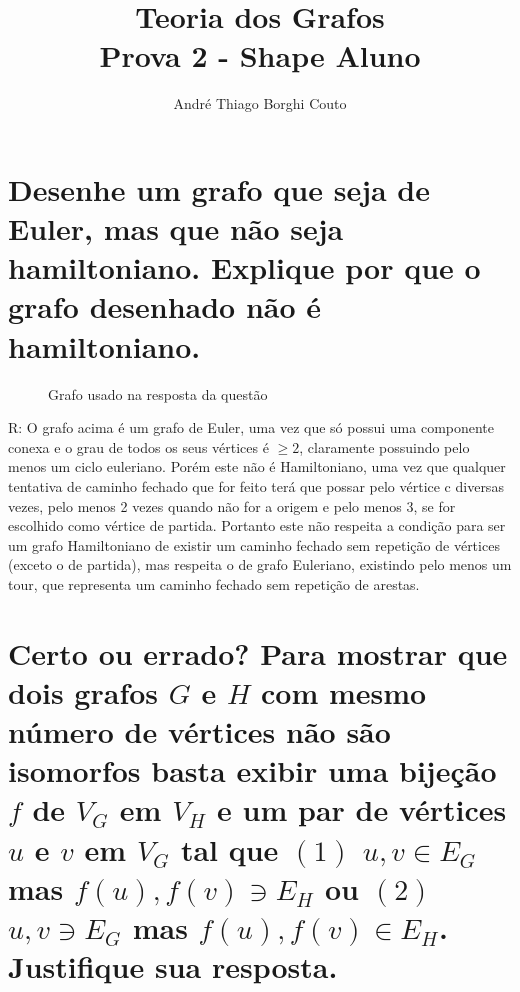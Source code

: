 \documentclass[final,3p,12pt]{elsarticle}
\begin{document}
	\begin{frontmatter}

		\title{Teoria dos Grafos \\
		\large Prova 2 - Shape Aluno}

		\author{André Thiago Borghi Couto}
		\address{São Mateus - ES, Brasil}
	\end{frontmatter}

\section{Desenhe um grafo que seja de Euler, mas que não seja hamiltoniano. Explique por que o grafo desenhado não é hamiltoniano.}
	\label{S:1}

		\begin{figure}[!ht]
			\centering
			\caption{Grafo usado na resposta da questão \thesection}
		\end{figure}

		R: O grafo acima é um grafo de Euler, uma vez que só possui uma componente conexa e o grau de todos os seus vértices é $\geq 2$, claramente possuindo pelo menos um ciclo euleriano. Porém este não é Hamiltoniano, uma vez que qualquer tentativa de caminho fechado que for feito terá que possar pelo vértice c diversas vezes, pelo menos 2 vezes quando não for a origem e pelo menos 3, se for escolhido como vértice de partida. Portanto este não respeita a condição para ser um grafo Hamiltoniano de existir um caminho fechado sem repetição de vértices (exceto o de partida), mas respeita o de grafo Euleriano, existindo pelo menos um tour, que representa um caminho fechado sem repetição de arestas.

\section{Certo ou errado? Para mostrar que dois grafos $G$ e $H$ com mesmo número de vértices não são isomorfos basta exibir uma bijeção $f$ de $V_G$ em $V_H$ e um par de vértices $u$ e $v$ em $V_G$ tal que $(1)$ ${u,v} \in E_G$ mas ${f(u), f(v)} \ni E_H$ ou $(2)$${u,v} \ni E_G$ mas ${f(u), f(v)} \in E_H$. Justifique sua resposta.}
	\label{S:2}
\end{document}
